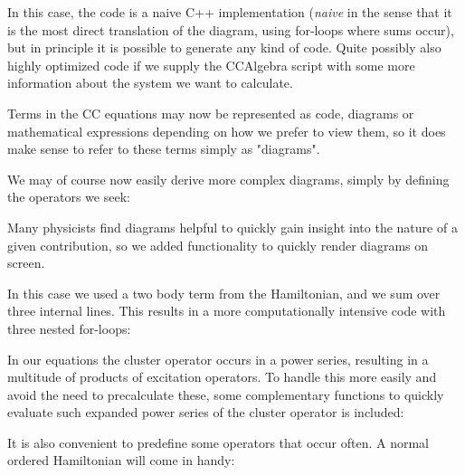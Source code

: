 In this case, the code is a naive C++ implementation (\emph{naive} in
the sense that it is the most direct translation of the diagram, using
for-loops where sums occur), but in principle it is possible to
generate any kind of code. Quite possibly also highly optimized code
if we supply the CCAlgebra script with some more information about the
system we want to calculate.

Terms in the CC equations may now be represented as code, diagrams or
mathematical expressions depending on how we prefer to view them, so it does make sense to
refer to these terms simply as "diagrams".

We may of course now easily derive more complex diagrams, simply by defining the operators we seek:

\begin{minipage}{\linewidth}
\end{minipage}

Many physicists find diagrams helpful to quickly gain insight into the
nature of a given contribution, so we added functionality to quickly render diagrams on screen.

\begin{minipage}{\linewidth}
\end{minipage}

In this case we used a two body term from the Hamiltonian, and we sum
over three internal lines. This results in a more computationally
intensive code with three nested for-loops:

\begin{minipage}{\linewidth}
\end{minipage}

In our equations the cluster operator occurs in a power series,
resulting in a multitude of products of excitation operators. To
handle this more easily and avoid the need to precalculate these, some
complementary functions to quickly evaluate such expanded power series
of the cluster operator is included:

\begin{minipage}{\linewidth}
\end{minipage}

It is also convenient to predefine some operators that occur often. A normal ordered Hamiltonian will come in handy:

